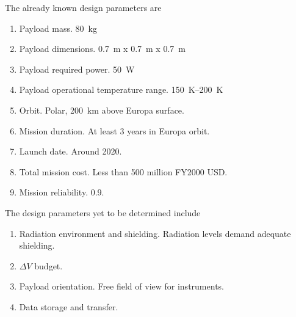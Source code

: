 The already known design parameters are

\begin{enumerate}
\item{Payload mass.} \SI{80}{kg}
\item{Payload dimensions.} \SI{0.7}{m} x \SI{0.7}{m} x \SI{0.7}{m}
\item{Payload required power.} \SI{50}{W}
\item{Payload operational temperature range.} \SI{150}{K}--\SI{200}{K}
\item{Orbit.} Polar, \SI{200}{km} above Europa surface.
\item{Mission duration.} At least 3 years in Europa orbit.
\item{Launch date.} Around 2020.
\item{Total mission cost.} Less than 500 million FY2000 USD.
\item{Mission reliability.} 0.9.
\end{enumerate}

The design parameters yet to be determined include

\begin{enumerate}
\item{Radiation environment and shielding.} Radiation levels demand adequate
  shielding.
\item{$\Delta V$ budget.}
\item{Payload orientation.} Free field of view for instruments.
\item{Data storage and transfer.}
\end{enumerate}
